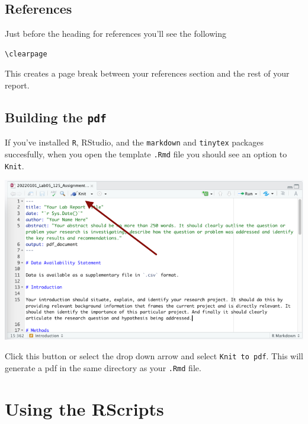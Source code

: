\documentclass[
]{book}
\begin{document}
\hypertarget{references}{%
\subsection*{References}\label{references}}

Just before the heading for references you'll see the following

\begin{verbatim}
\clearpage
\end{verbatim}

This creates a page break between your references section and the rest of your report.

\hypertarget{building-the-pdf}{%
\subsection*{\texorpdfstring{Building the \texttt{pdf}}{Building the pdf}}\label{building-the-pdf}}

If you've installed \texttt{R}, RStudio, and the \texttt{markdown} and \texttt{tinytex} packages succesfully, when you open the template \texttt{.Rmd} file you should see an option to \texttt{Knit}.

\includegraphics{images/Knit_20220101.png}

Click this button or select the drop down arrow and select \texttt{Knit\ to\ pdf}. This will generate a pdf in the same directory as your \texttt{.Rmd} file.

\hypertarget{using-the-rscripts}{%
\section*{Using the RScripts}\label{using-the-rscripts}}
\end{document}
